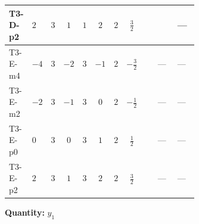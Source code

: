 \documentclass[8pt]{article}
\begin{document}
\begin{landscape}
\begin{longtable}{@{}llcccccc >{\raggedright\arraybackslash}p{0.21\linewidth} >{\raggedright\arraybackslash}p{0.21\linewidth} >{\raggedright\arraybackslash}p{0.21\linewidth}@{}}
\midrule
T3-D-p2 & $2$ & $3$ & $1$ & $1$ & $2$ & $2$ & $\frac{3}{2}$ & \scriptsize\adjustbox{max width=\linewidth}{$\begin{gathered} T_{\nu}^{(1)} \left({y_1}\right)_{ij}\end{gathered}$} & \scriptsize\adjustbox{max width=\linewidth}{$\begin{gathered} +\frac{1}{2} (\left({y_2}\,\left({y_2}\right)^{\dagger}\,{y_1}\right)_{ij}+\left({Y_e}\,\left({Y_e}\right)^{\dagger}\,{y_1}\right)_{ij}+3 \left({y_1}\,\left({y_1}\right)^{\dagger}\,{y_1}\right)_{ij})\end{gathered}$} & --- \\
\midrule
T3-E-m4 & $-4$ & $3$ & $-2$ & $3$ & $-1$ & $2$ & $-\frac{3}{2}$ & \scriptsize\adjustbox{max width=\linewidth}{$\begin{gathered} T_{\nu}^{(1)} \left({y_1}\right)_{ij}\end{gathered}$} & --- & --- \\
\midrule
T3-E-m2 & $-2$ & $3$ & $-1$ & $3$ & $0$ & $2$ & $-\frac{1}{2}$ & \scriptsize\adjustbox{max width=\linewidth}{$\begin{gathered} T_{\nu}^{(1)} \left({y_1}\right)_{ij}\end{gathered}$} & --- & --- \\
\midrule
T3-E-p0 & $0$ & $3$ & $0$ & $3$ & $1$ & $2$ & $\frac{1}{2}$ & \scriptsize\adjustbox{max width=\linewidth}{$\begin{gathered} T_{\nu}^{(1)} \left({y_1}\right)_{ij}\end{gathered}$} & --- & --- \\
\midrule
T3-E-p2 & $2$ & $3$ & $1$ & $3$ & $2$ & $2$ & $\frac{3}{2}$ & \scriptsize\adjustbox{max width=\linewidth}{$\begin{gathered} T_{\nu}^{(1)} \left({y_1}\right)_{ij}\end{gathered}$} & --- & --- \\
\midrule
\bottomrule
\end{longtable}
\clearpage
\noindent\textbf{Quantity: }$y_1$\par\smallskip

\end{landscape}
\end{document}
